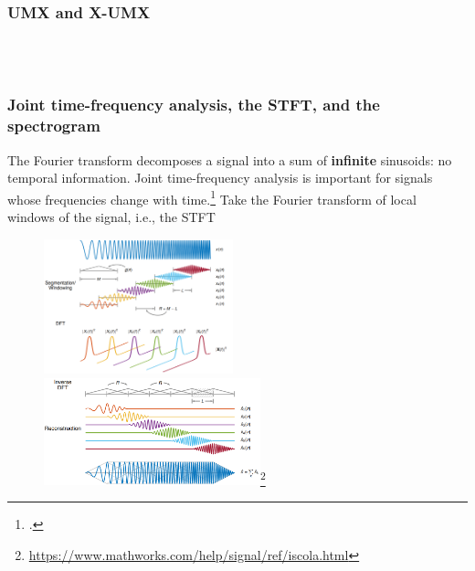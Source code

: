 \documentclass[usenames,dvipsnames]{beamer}
\begin{document}
\begin{frame}
	\frametitle{UMX and X-UMX}
	\begin{figure}[ht]
		\centering
		\\
		\\
	\end{figure}
\end{frame}

\begin{frame}
	\frametitle{Joint time-frequency analysis, the STFT, and the spectrogram}
	The Fourier transform decomposes a signal into a sum of \textbf{infinite} sinusoids: no temporal information. Joint time-frequency analysis is important for signals whose frequencies change with time.\footcite{gabor1946} Take the Fourier transform of local windows of the signal, i.e., the STFT
	\begin{figure}
		\includegraphics[height=3.9cm]{./images-mila-presentation/stft_diagram1.png}
		\hspace{-0.75em}
		\includegraphics[height=3.1cm]{./images-mila-presentation/stft_diagram2.png}\footnote{\url{https://www.mathworks.com/help/signal/ref/iscola.html}}
	\end{figure}
\end{frame}
\end{document}
